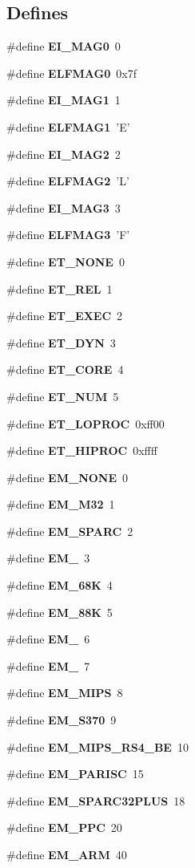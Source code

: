 \subsection*{Defines}
\begin{CompactItemize}
\item 
\#define {\bf EI\_\-MAG0}~0
\item 
\#define {\bf ELFMAG0}~0x7f
\item 
\#define {\bf EI\_\-MAG1}~1
\item 
\#define {\bf ELFMAG1}~'E'
\item 
\#define {\bf EI\_\-MAG2}~2
\item 
\#define {\bf ELFMAG2}~'L'
\item 
\#define {\bf EI\_\-MAG3}~3
\item 
\#define {\bf ELFMAG3}~'F'
\item 
\#define {\bf ET\_\-NONE}~0
\item 
\#define {\bf ET\_\-REL}~1
\item 
\#define {\bf ET\_\-EXEC}~2
\item 
\#define {\bf ET\_\-DYN}~3
\item 
\#define {\bf ET\_\-CORE}~4
\item 
\#define {\bf ET\_\-NUM}~5
\item 
\#define {\bf ET\_\-LOPROC}~0xff00
\item 
\#define {\bf ET\_\-HIPROC}~0xffff
\item 
\#define {\bf EM\_\-NONE}~0
\item 
\#define {\bf EM\_\-M32}~1
\item 
\#define {\bf EM\_\-SPARC}~2
\item 
\#define {\bf EM\_}~3
\item 
\#define {\bf EM\_\-68K}~4
\item 
\#define {\bf EM\_\-88K}~5
\item 
\#define {\bf EM\_}~6
\item 
\#define {\bf EM\_}~7
\item 
\#define {\bf EM\_\-MIPS}~8
\item 
\#define {\bf EM\_\-S370}~9
\item 
\#define {\bf EM\_\-MIPS\_\-RS4\_\-BE}~10
\item 
\#define {\bf EM\_\-PARISC}~15
\item 
\#define {\bf EM\_\-SPARC32PLUS}~18
\item 
\#define {\bf EM\_\-PPC}~20
\item 
\#define {\bf EM\_\-ARM}~40
\item 

\end{CompactItemize}
